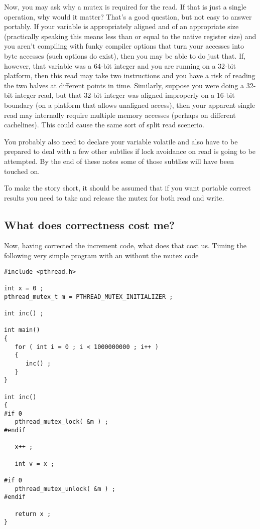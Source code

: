 Now, you may ask why a mutex is required for the read.  If that is just a single operation, why would it matter?  That's a good question, but not easy to answer portably.  If your variable is appropriately aligned and of an appropriate size (practically speaking this means less than or equal to the native register size) and you aren't compiling with funky compiler options that turn your accesses into byte accesses (such options do exist), then you may be able to do just that.  If, however, that variable was a 64-bit integer and you are running on a 32-bit platform, then this read may take two instructions and you have a risk of reading the two halves at different points in time.  Similarly, suppose you were doing a 32-bit integer read, but that 32-bit integer was aligned improperly on a 16-bit boundary (on a platform that allows unaligned access), then your apparent single read may internally require multiple memory accesses (perhaps on different cachelines).  This could cause the same sort of split read scenerio.

You probably also need to declare your variable volatile and also have to be prepared to deal with a few other subtlies if lock avoidance on read is going to be attempted.  By the end of these notes some of those subtlies will have been touched on.

To make the story short, it should be assumed that if you want portable correct results you need to take and release the mutex for both read and write.

\subsection{What does correctness cost me?}

Now, having corrected the increment code, what does that cost us.  Timing the following very simple program with an without the mutex code

\begin{lstlisting}
#include <pthread.h>

int x = 0 ;
pthread_mutex_t m = PTHREAD_MUTEX_INITIALIZER ;

int inc() ;

int main()
{
   for ( int i = 0 ; i < 1000000000 ; i++ )
   {
      inc() ;
   }
}

int inc()
{
#if 0
   pthread_mutex_lock( &m ) ;
#endif

   x++ ;

   int v = x ;

#if 0
   pthread_mutex_unlock( &m ) ;
#endif

   return x ;
}
\end{lstlisting}

